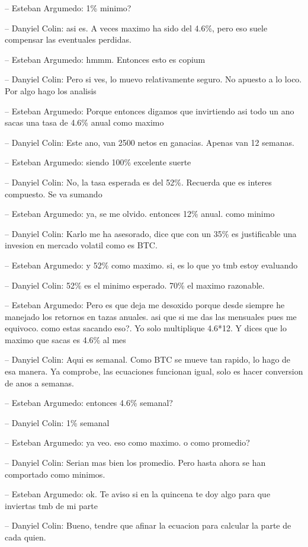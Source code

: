-- Esteban Argumedo: 1\% minimo?

-- Danyiel Colin: asi es. A veces maximo ha sido del 4.6\%, pero eso
suele compensar las eventuales perdidas.

-- Esteban Argumedo: hmmm. Entonces esto es copium

-- Danyiel Colin: Pero si ves, lo muevo relativamente seguro. No apuesto
a lo loco. Por algo hago los analisis

-- Esteban Argumedo: Porque entonces digamos que invirtiendo asi todo un
ano sacas una tasa de 4.6\% anual como maximo

-- Danyiel Colin: Este ano, van 2500 netos en ganacias. Apenas van 12
semanas.

-- Esteban Argumedo: siendo 100\% excelente suerte

-- Danyiel Colin: No, la tasa esperada es del 52\%. Recuerda que es
interes compuesto. Se va sumando

-- Esteban Argumedo: ya, se me olvido. entonces 12\% anual. como minimo

-- Danyiel Colin: Karlo me ha asesorado, dice que con un 35\% es
justificable una invesion en mercado volatil como es BTC.

-- Esteban Argumedo: y 52\% como maximo. si, es lo que yo tmb estoy
evaluando

-- Danyiel Colin: 52\% es el minimo esperado. 70\% el maximo razonable.

-- Esteban Argumedo: Pero es que deja me desoxido porque desde siempre
he manejado los retornos en tazas anuales. asi que si me das las
mensuales pues me equivoco. como estas sacando eso?. Yo solo multiplique
4.6*12. Y dices que lo maximo que sacas es 4.6\% al mes

-- Danyiel Colin: Aqui es semanal. Como BTC se mueve tan rapido, lo hago
de esa manera. Ya comprobe, las ecuaciones funcionan igual, solo es
hacer conversion de anos a semanas.

-- Esteban Argumedo: entonces 4.6\% semanal?

-- Danyiel Colin: 1\% semanal

-- Esteban Argumedo: ya veo. eso como maximo. o como promedio?

-- Danyiel Colin: Serian mas bien los promedio. Pero hasta ahora se han
comportado como minimos.

-- Esteban Argumedo: ok. Te aviso si en la quincena te doy algo para que
inviertas tmb de mi parte

-- Danyiel Colin: Bueno, tendre que afinar la ecuacion para calcular la
parte de cada quien.

